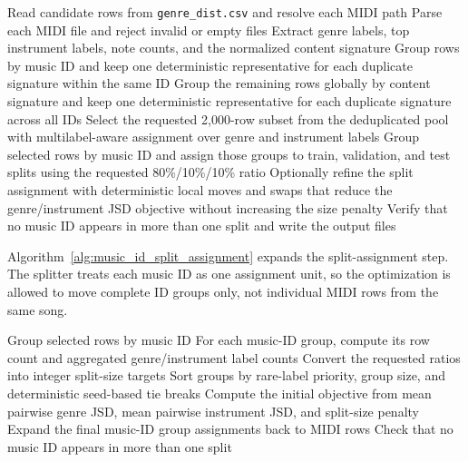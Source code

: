 \begin{algorithm}[htbp]
	\caption{Deduplicated and leakage-aware split construction}
	\label{alg:dataset_split_construction}
	\DontPrintSemicolon
	Read candidate rows from \texttt{genre\_dist.csv} and resolve each MIDI path\;
	Parse each MIDI file and reject invalid or empty files\;
	Extract genre labels, top instrument labels, note counts, and the normalized content signature\;
	Group rows by music ID and keep one deterministic representative for each duplicate signature within the same ID\;
	Group the remaining rows globally by content signature and keep one deterministic representative for each duplicate signature across all IDs\;
	Select the requested 2,000-row subset from the deduplicated pool with multilabel-aware assignment over genre and instrument labels\;
	Group selected rows by music ID and assign those groups to train, validation, and test splits using the requested 80\%/10\%/10\% ratio\;
	Optionally refine the split assignment with deterministic local moves and swaps that reduce the genre/instrument JSD objective without increasing the size penalty\;
	Verify that no music ID appears in more than one split and write the output files\;
\end{algorithm}

Algorithm~\ref{alg:music_id_split_assignment} expands the split-assignment step. The splitter treats each music ID as one assignment unit, so the optimization is allowed to move complete ID groups only, not individual MIDI rows from the same song.

\begin{algorithm}[htbp]
	\caption{Music-ID grouped split assignment}
	\label{alg:music_id_split_assignment}
	\DontPrintSemicolon
	Group selected rows by music ID\;
	For each music-ID group, compute its row count and aggregated genre/instrument label counts\;
	Convert the requested ratios into integer split-size targets\;
	Sort groups by rare-label priority, group size, and deterministic seed-based tie breaks\;
	Compute the initial objective from mean pairwise genre JSD, mean pairwise instrument JSD, and split-size penalty\;
	Expand the final music-ID group assignments back to MIDI rows\;
	Check that no music ID appears in more than one split\;
\end{algorithm}

